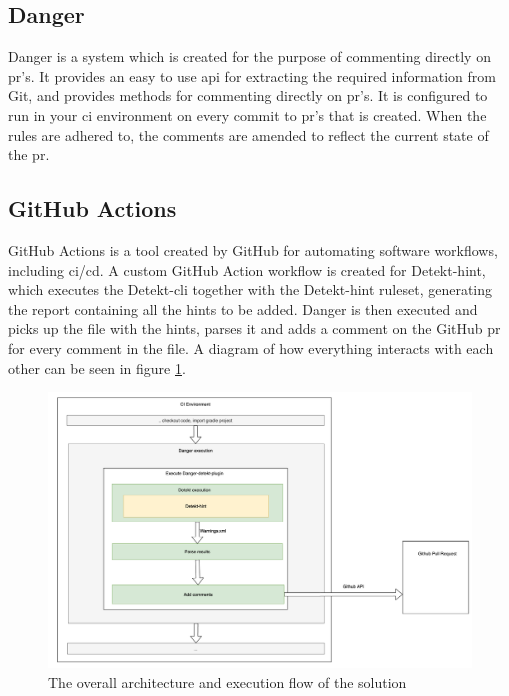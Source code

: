 \documentclass{report}
\begin{document}
\subsection{Danger}
Danger is a system which is created for the purpose of commenting directly on \gls{pr}'s. It provides an easy to use \gls{api} for extracting the required information from Git, and provides methods for commenting directly on \gls{pr}'s. It is configured to run in your \gls{ci} environment on every commit to \gls{pr}'s that is created. When the rules are adhered to, the comments are amended to reflect the current state of the \gls{pr}. 

\subsection{GitHub Actions}
GitHub Actions is a tool created by GitHub for automating software workflows, including \gls{ci}/\gls{cd}. A custom GitHub Action workflow is created for Detekt-hint, which executes the Detekt-\gls{cli} together with the Detekt-hint ruleset, generating the report containing all the hints to be added. Danger is then executed and picks up the file with the hints, parses it and adds a comment on the GitHub \gls{pr} for every comment in the file. A diagram of how everything interacts with each other can be seen in figure \ref{fig:integration}. 


\begin{figure}
    \centering
    \includegraphics[width=\textwidth]{report/images/execution-flow.png}
    \caption{The overall architecture and execution flow of the solution}
    \label{fig:integration}
\end{figure}
\end{document}
